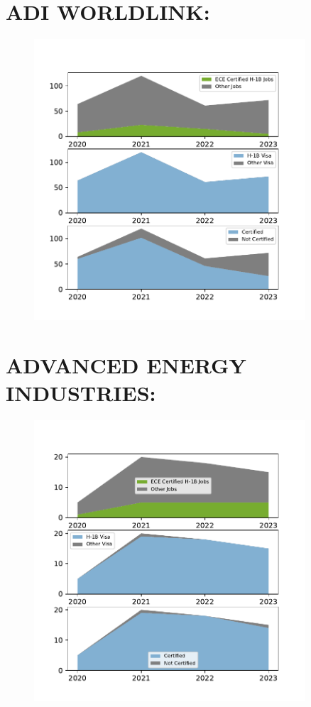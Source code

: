 \documentclass{article}%
\begin{document}
%
\section{ADI WORLDLINK:}%
\label{sec:ADIWORLDLINK}%


\begin{figure}[h]%
\centering%
\includegraphics[width=0.9\textwidth]{./temp_img/ADIWORLDLINK_detailed.pdf}%
\end{figure}

%
\section{ADVANCED ENERGY INDUSTRIES:}%
\label{sec:ADVANCEDENERGYINDUSTRIES}%


\begin{figure}[h]%
\centering%
\includegraphics[width=0.9\textwidth]{./temp_img/ADVANCEDENERGYINDUSTRIES_detailed.pdf}%
\end{figure}

%
\end{document}
